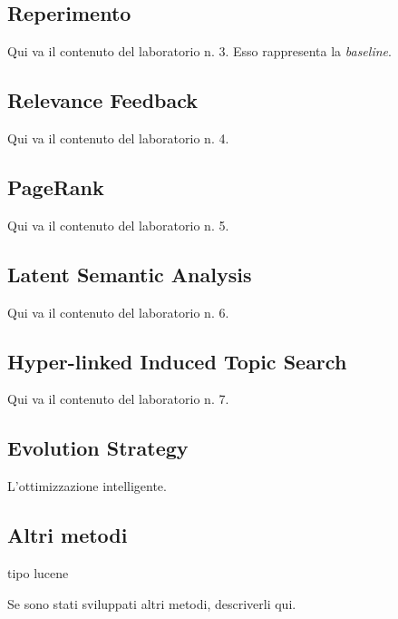 \subsection{Reperimento}
\label{sec:metodi-di-reper}

Qui va il contenuto del laboratorio n. 3. Esso rappresenta la \textit{baseline}.

\subsection{Relevance Feedback}
\label{sec:relevance-feedback}

Qui va il contenuto del laboratorio n. 4.

\subsection{PageRank}
\label{sec:pagerank}

Qui va il contenuto del laboratorio n. 5.

\subsection{Latent Semantic Analysis}
\label{sec:lsa}

Qui va il contenuto del laboratorio n. 6.

\subsection{Hyper-linked Induced Topic Search}
\label{sec:hits}

Qui va il contenuto del laboratorio n. 7.

\subsection{Evolution Strategy}
\label{sec:es}

L'ottimizzazione intelligente.

\subsection{Altri metodi}
tipo lucene
\label{sec:altri-metodi}

Se sono stati sviluppati altri metodi, descriverli qui.

